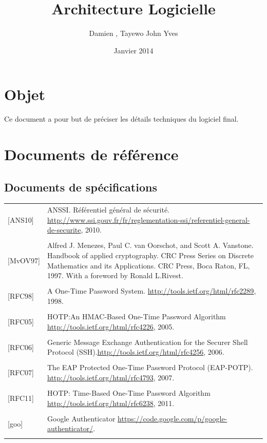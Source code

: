 \documentclass{"../../res/univ-projet"}
\title{Architecture Logicielle}
\author{Damien \bsc{Picard}, Tayewo John Yves \bsc{Adegoloye}}
\date{Janvier 2014}
\begin{document}
\maketitle
\section{Objet}
Ce document a pour but de préciser les détails techniques du logiciel final.

\section{Documents de référence}
\subsection{Documents de spécifications}
\begin{tabular}{p{}>{\raggedright\arraybackslash}p{13cm}}
    {[ANS10]} & {ANSSI. Référentiel général de sécurité. \href{http://www.ssi.gouv.fr/fr/reglementation-ssi/referentiel-general-de-securite}{http://www.ssi.gouv.fr/fr/reglementation-ssi/referentiel-general-de-securite}, 2010.}
    \tabularnewline
    \\
    {[MvOV97]} & {Alfred J. Menezes, Paul C. van Oorschot, and Scott A. Vanstone. Handbook of applied cryptography. CRC Press Series on Discrete Mathematics and its Applications. CRC Press, Boca Raton, FL, 1997. With a foreword by Ronald L.Rivest.}
    \tabularnewline
    \\
    {[RFC98]} & {A One-Time Password System. \href{http://tools.ietf.org/html/rfc2289}{http://tools.ietf.org/html/rfc2289}, 1998.}
    \tabularnewline
    \\
    {[RFC05]} & {HOTP:An HMAC-Based One-Time Password Algorithm \href{http://tools.ietf.org/html/rfc4226}{http://tools.ietf.org/html/rfc4226}, 2005.}
    \tabularnewline
    \\
    {[RFC06]} & {Generic Message Exchange Authentication for the Securer Shell Protocol (SSH).\href{http://tools.ietf.org/html/rfc4256}{http://tools.ietf.org/html/rfc4256}, 2006.}
    \tabularnewline
    \\
    {[RFC07]} & {The EAP Protected One-Time Password Protocol (EAP-POTP). \href{http://tools.ietf.org/html/rfc4793}{http://tools.ietf.org/html/rfc4793}, 2007.}
    \tabularnewline
    \\
    {[RFC11]} & {HOTP: Time-Based One-Time Password Algorithm \href{http://tools.ietf.org/html/rfc6238}{http://tools.ietf.org/html/rfc6238}, 2011.}
    \tabularnewline
    \\
    {[goo]} & {Google Authenticator \href{https://code.google.com/p/google-authenticator/}{https://code.google.com/p/google-authenticator/}.}
    \tabularnewline
    \\
\end{tabular}
\end{document}
